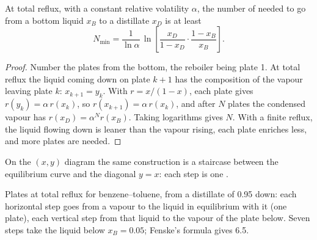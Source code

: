 \begin{proposition}[Fenske]\label{prop:b2:liquid-vapour-diagrams:fenske}
At total reflux, with a constant relative volatility $\alpha$, the number of
 needed to go from a bottom liquid $x_B$ to a distillate
$x_D$ is at least
\[
  N_{\min} = \frac{1}{\ln\alpha}\,\ln\!\left[\frac{x_D}{1 - x_D}\cdot\frac{1 - x_B}{x_B}\right] .
\]
\end{proposition}

\begin{proof}
Number the plates from the bottom, the reboiler being plate 1. At total reflux
the liquid coming down on plate $k + 1$ has the composition of the vapour
leaving plate $k$: $x_{k+1} = y_k$. With $r = x/(1 - x)$, each plate gives
$r(y_k) = \alpha\,r(x_k)$, so $r(x_{k+1}) = \alpha\,r(x_k)$, and after $N$
plates the condensed vapour has $r(x_D) = \alpha^N r(x_B)$. Taking logarithms
gives $N$. With a finite reflux, the liquid flowing down is leaner than the
vapour rising, each plate enriches less, and more plates are needed.
\end{proof}

On the $(x, y)$ diagram the same construction is a staircase between the
equilibrium curve and the diagonal $y = x$: each step is one .

\begin{omfigure}

{\small Plates at total reflux for benzene--toluene, from a distillate of
0.95 down: each horizontal step goes from a vapour to the liquid in
equilibrium with it (one plate), each vertical step from that liquid to the
vapour of the plate below. Seven steps take the liquid below $x_B = 0.05$;
Fenske's formula gives 6.5.}
\end{omfigure}

